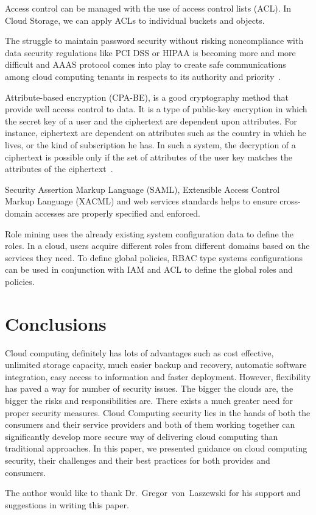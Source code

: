 Access control can be managed with the use of access control 
lists (ACL). In Cloud Storage, we can apply ACLs to individual
buckets and objects.

The struggle to maintain password security without risking 
noncompliance with data security regulations like PCI DSS 
or HIPAA is becoming more and more difficult and AAAS protocol
comes into play to create safe communications among cloud 
computing tenants in respects to its authority
and priority~\cite{hid-sp18-513-poland}. 

Attribute-based encryption (CPA-BE), is a good cryptography 
method that provide well access control to data. It is a type of 
public-key encryption in which the secret key of a user and the 
ciphertext are dependent upon attributes. For instance, ciphertext
are dependent on attributes such as the country in which he lives,
or the kind of subscription he has. In such a system, the decryption
of a ciphertext is possible only if the set of attributes of the user
key matches the attributes of the ciphertext~\cite{hid-sp18-513-poland}.

Security Assertion Markup Language (SAML), Extensible Access Control
Markup Language (XACML) and web services standards helps to ensure
cross-domain accesses are properly specified and enforced.

Role mining uses the already existing system configuration data to
define the roles. In a cloud, users acquire different roles from
different domains based on the services they need. To define global 
policies, RBAC type systems configurations can be used in conjunction
with IAM and ACL to define the global roles and policies.

\section{Conclusions}
Cloud computing definitely has lots of advantages such as cost effective, 
unlimited storage capacity, much easier backup and recovery, automatic
software integration, easy access to information and faster deployment. 
However, flexibility has paved a way for number of security issues.
The bigger the clouds are, the bigger the risks and responsibilities are. 
There exists a much greater need for proper security measures.
Cloud Computing security lies in the hands of both the consumers and their
service providers and both of them working together can significantly 
develop more secure way of delivering cloud computing than traditional 
approaches. In this paper, we presented guidance on cloud computing security,
their challenges and their best practices for both provides and consumers.

\begin{acks}
The author would like to thank Dr.~Gregor~von~Laszewski for his support and 
suggestions in writing this paper.
\end{acks}


 
